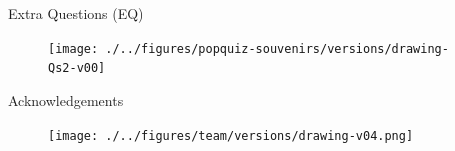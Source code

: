 {
\begin{frame}{Extra Questions (EQ)}
  \begin{figure}
  \centering
  \texttt{[image: ./../figures/popquiz-souvenirs/versions/drawing-Qs2-v00]}
  \end{figure}

\end{frame}
}



{
\begin{frame}{Acknowledgements}

  \begin{figure}
  \centering
  \texttt{[image: ./../figures/team/versions/drawing-v04.png]}
  \end{figure}

\end{frame}
}

